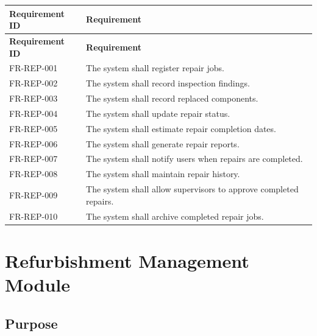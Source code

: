 \begin{longtable}{|p{3cm}|p{10.2cm}|}

\hline
\textbf{Requirement ID} &
\textbf{Requirement}\\
\hline
\endfirsthead

\hline
\textbf{Requirement ID} &
\textbf{Requirement}\\
\hline
\endhead

FR-REP-001 &
The system shall register repair jobs.\\
\hline

FR-REP-002 &
The system shall record inspection findings.\\
\hline

FR-REP-003 &
The system shall record replaced components.\\
\hline

FR-REP-004 &
The system shall update repair status.\\
\hline

FR-REP-005 &
The system shall estimate repair completion dates.\\
\hline

FR-REP-006 &
The system shall generate repair reports.\\
\hline

FR-REP-007 &
The system shall notify users when repairs are completed.\\
\hline

FR-REP-008 &
The system shall maintain repair history.\\
\hline

FR-REP-009 &
The system shall allow supervisors to approve completed repairs.\\
\hline

FR-REP-010 &
The system shall archive completed repair jobs.\\
\hline

\end{longtable}

\section{Refurbishment Management Module}
\label{sec:refurbishment}

\subsection{Purpose}


